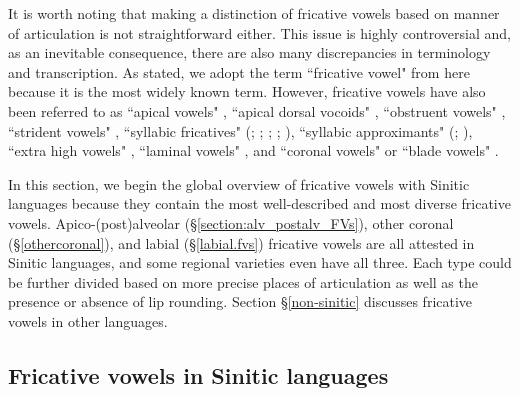 \documentclass[output=paper,colorlinks,citecolor=brown,chinesefont]{langscibook}
\begin{document}
\largerpage
It is worth noting that making a distinction of fricative vowels based on manner of articulation is not straightforward either. This issue is highly controversial and, as an inevitable consequence, there are also many discrepancies in terminology and transcription. As stated, we adopt the term ``fricative vowel" from \citet{Ladefoged&Maddieson_1996} here because it is the most widely known term. However, fricative vowels have also been referred to as ``apical vowels" \citep{Karlgren_1915}, ``apical dorsal vocoids" \citep{Demolin_2002}, ``obstruent vowels" \citep{Faytak_2014a}, ``strident vowels" \citep{Hu&Ling_2019}, ``syllabic fricatives" (\cite[47]{Chao_1968}; \cite[44]{Duanmu_2007}; \cite[72]{Lin_2007}; \cite{Chen&Gussenhoven_2015}; \cite{shao_2020}), ``syllabic approximants" (\cite{Lee&Zee_2003}; \cite{Chen&Guo_2022}), ``extra high vowels" \citep{Yoder_2020}, ``laminal vowels" \citep{Aoi&Niigata_2013}, and ``coronal vowels" or ``blade vowels" \citep{laver_1994}.

In this section, we begin the global overview of fricative vowels with Sinitic languages because they contain the most well-described and most diverse fricative vowels. Apico-(post)alveolar (§\ref{section:alv_postalv_FVs}), other coronal (§\ref{othercoronal}), and labial (§\ref{labial.fvs}) fricative vowels are all attested in Sinitic languages, and some regional varieties even have all three. Each type could be further divided based on more precise places of articulation as well as the presence or absence of lip rounding. Section §\ref{non-sinitic} discusses fricative vowels in other languages.


\subsection{Fricative vowels in Sinitic languages} \label{sectionsinitic}
\end{document}
